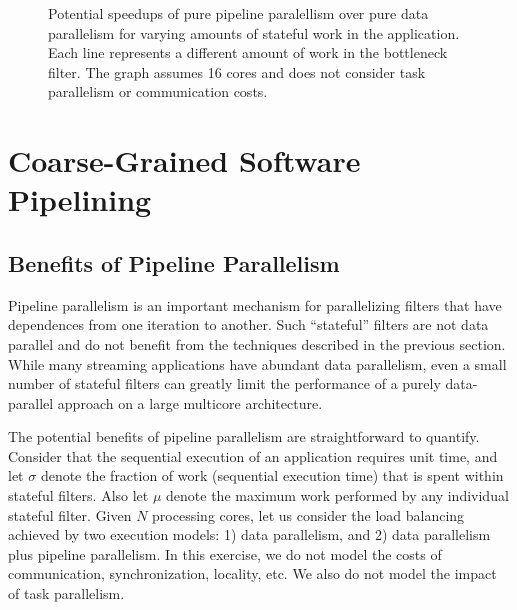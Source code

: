 \begin{figure}[t]
\begin{center}
\end{center}
\caption{Potential speedups of pure pipeline paralellism over pure data
parallelism for varying amounts of stateful work in the application.
Each line represents a different amount of work in the bottleneck
filter.  The graph assumes 16 cores and does not consider task
parallelism or communication costs.
\protect\label{fig:model-speedup}}
\end{figure}

\section{Coarse-Grained Software Pipelining}
\label{sec:softpipe}

\subsection{Benefits of Pipeline Parallelism}
\label{sec:pipeline-model}

Pipeline parallelism is an important mechanism for parallelizing
filters that have dependences from one iteration to another.  Such
``stateful'' filters are not data parallel and do not benefit from the
techniques described in the previous section.  While many streaming
applications have abundant data parallelism, even a small number of
stateful filters can greatly limit the performance of a purely
data-parallel approach on a large multicore architecture.

The potential benefits of pipeline parallelism are straightforward to
quantify.  Consider that the sequential execution of an application
requires unit time, and let $\sigma$ denote the fraction of work
(sequential execution time) that is spent within stateful filters.
Also let $\mu$ denote the maximum work performed by any individual
stateful filter.  Given $N$ processing cores, let us consider the load
balancing achieved by two execution models: 1) data parallelism, and
2) data parallelism plus pipeline parallelism.  In this exercise, we
do not model the costs of communication, synchronization, locality,
etc.  We also do not model the impact of task parallelism.

